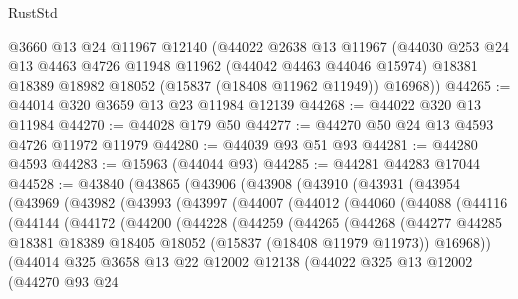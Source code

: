 \begin{lexlean}{RustStd}
\begin{coremodule}
{\begin{coremodule}
{{{{{{{{{{{{{{{{{{{{{{{{{{{{{{{{{{{{{{{{{{{{{{{{{{{{{{{{{{{{    @3660
    @13
    @24
    @11967
    @12140
    (@44022
      @2638
      @13
      @11967
      (@44030
        @253
        @24
        @13
        @4463
        @4726
        @11948
        @11962
        (@44042 @4463 @44046 @15974)
        @18381
        @18389
        @18982
        @18052
        (@15837 (@18408 @11962 @11949))
        @16968))
@44265 := @44014 @320 @3659 @13 @23 @11984 @12139
@44268 := @44022 @320 @13 @11984
@44270 := @44028 @179 @50
@44277 := @44270 @50 @24 @13 @4593 @4726 @11972 @11979
@44280 := @44039 @93 @51 @93
@44281 := @44280 @4593
@44283 := @15963 (@44044 @93)
@44285 := @44281 @44283 @17044
@44528 := @43840
    (@43865
      (@43906
        (@43908
          (@43910
            (@43931
              (@43954
                (@43969
                  (@43982
                    (@43993
                      (@43997
                        (@44007
                          (@44012
                            (@44060
                              (@44088
                                (@44116
                                  (@44144
                                    (@44172
                                      (@44200
                                        (@44228
                                          (@44259
                                            (@44265
                                              (@44268
                                                (@44277
                                                  @44285
                                                  @18381
                                                  @18389
                                                  @18405
                                                  @18052
                                                  (@15837 (@18408 @11979 @11973))
                                                  @16968))
                                              (@44014
                                                @325
                                                @3658
                                                @13
                                                @22
                                                @12002
                                                @12138
                                                (@44022
                                                  @325
                                                  @13
                                                  @12002
                                                  (@44270
                                                    @93
                                                    @24
}}}}}}}}}}}}}}}}}}}}}}}}}}}}}}}}}}}}}}}}}}}}}}}}}}}}}}}}}}}}
\end{coremodule}}
\end{coremodule}
\end{lexlean}
